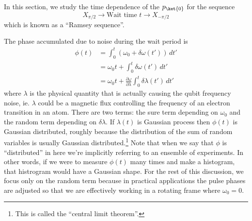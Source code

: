 
In this section, we study the time dependence of the $p_\ket{0}$ for the sequence
\begin{equation}
  X_{\pi/2} \longrightarrow \text{Wait time }t \longrightarrow X_{-\pi/2}
\end{equation}
which is known as a ``Ramsey sequence''.


The phase accumulated due to noise during the wait period is
\begin{align}
\phi(t)
  &= \int_0^t \left( \omega_0 + \delta \omega (t') \right) \, dt' \nonumber \\
  &= \omega_0 t + \int_0^t \delta \omega (t') \, dt' \nonumber \\
  &= \omega_0 t + \frac{\partial \omega}{\partial \lambda} \int_0^t \delta \lambda(t') \, dt' \label{eq:sure_and_random}
\end{align}
where $\lambda$ is the physical quantity that is actually causing the qubit frequency noise, ie. $\lambda$ could be a magnetic flux controlling the frequency of an electron transition in an atom.
There are two terms: the sure term depending on $\omega_0$ and the random term depending on $\delta \lambda$.
If $\lambda(t)$ is Gaussian process then $\phi(t)$ is Gaussian distributed, roughly because the distribution of the sum of random variables is usually Gaussian distributed.\footnote{This is called the ``central limit theorem''.}
Note that when we say that $\phi$ is ``distributed'' in here we're implicitly referring to an ensemble of experiments.
In other words, if we were to measure $\phi(t)$ many times and make a histogram, that histrogram would have a Gaussian shape.
For the rest of this discussion, we focus only on the random term because in practical applications the pulse phases are adjusted so that we are effectively working in a rotating frame where $\omega_0 = 0$.

